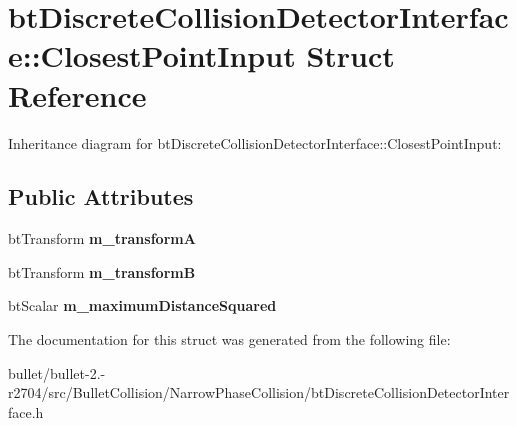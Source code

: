 \hypertarget{structbt_discrete_collision_detector_interface_1_1_closest_point_input}{\section{bt\+Discrete\+Collision\+Detector\+Interface\+:\+:Closest\+Point\+Input Struct Reference}
\label{structbt_discrete_collision_detector_interface_1_1_closest_point_input}
}


Inheritance diagram for bt\+Discrete\+Collision\+Detector\+Interface\+:\+:Closest\+Point\+Input\+:
\subsection*{Public Attributes}
\begin{DoxyCompactItemize}
\item 
\hypertarget{structbt_discrete_collision_detector_interface_1_1_closest_point_input_a7d3e89234d3bf33d65f204fd3e6011b2}{bt\+Transform {\bfseries m\+\_\+transform\+A}}\label{structbt_discrete_collision_detector_interface_1_1_closest_point_input_a7d3e89234d3bf33d65f204fd3e6011b2}

\item 
\hypertarget{structbt_discrete_collision_detector_interface_1_1_closest_point_input_a67dd72d1a1e0a4dd433530f9b396ee5f}{bt\+Transform {\bfseries m\+\_\+transform\+B}}\label{structbt_discrete_collision_detector_interface_1_1_closest_point_input_a67dd72d1a1e0a4dd433530f9b396ee5f}

\item 
\hypertarget{structbt_discrete_collision_detector_interface_1_1_closest_point_input_ae371e325c4e3131d2c5bbbf473895ae8}{bt\+Scalar {\bfseries m\+\_\+maximum\+Distance\+Squared}}\label{structbt_discrete_collision_detector_interface_1_1_closest_point_input_ae371e325c4e3131d2c5bbbf473895ae8}

\end{DoxyCompactItemize}


The documentation for this struct was generated from the following file\+:\begin{DoxyCompactItemize}
\item 
bullet/bullet-\/2.-\/r2704/src/\+Bullet\+Collision/\+Narrow\+Phase\+Collision/bt\+Discrete\+Collision\+Detector\+Interface.\+h\end{DoxyCompactItemize}
